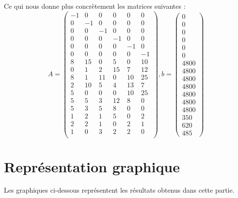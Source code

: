 Ce qui nous donne plus concrètement les matrices suivantes :
\[
A =
\begin{pmatrix}
   -1 &    0 &    0 &    0 &    0 &    0 \\
    0 &   -1 &    0 &    0 &    0 &    0 \\
    0 &    0 &   -1 &    0 &    0 &    0 \\
    0 &    0 &    0 &   -1 &    0 &    0 \\
    0 &    0 &    0 &    0 &   -1 &    0 \\
    0 &    0 &    0 &    0 &    0 &   -1 \\
\hline
    8 &   15 &    0 &    5 &    0 &   10 \\
    0 &    1 &    2 &   15 &    7 &   12 \\
    8 &    1 &   11 &    0 &   10 &   25 \\
    2 &   10 &    5 &    4 &   13 &    7 \\
    5 &    0 &    0 &    0 &   10 &   25 \\
    5 &    5 &    3 &   12 &    8 &    0 \\
    5 &    3 &    5 &    8 &    0 &    0 \\
\hline
    1 &    2 &    1 &    5 &    0 &    2 \\
    2 &    2 &    1 &    0 &    2 &    1 \\
    1 &    0 &    3 &    2 &    2 &    0 \\
\end{pmatrix}
, b = 
\begin{pmatrix}
0 \\ 0 \\ 0 \\ 0 \\ 0 \\ 0 \\
\hline
4800 \\ 4800 \\ 4800 \\ 4800 \\ 4800 \\ 4800 \\ 4800 \\
\hline
350 \\ 620 \\ 485
\end{pmatrix}
\]






\section{Représentation graphique}
Les graphiques ci-dessous représentent les résultats obtenus dans cette partie.


